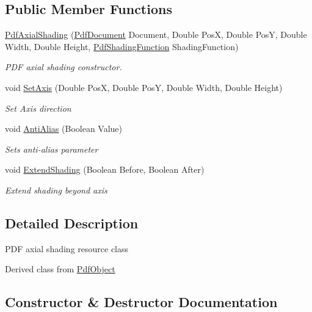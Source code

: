 \subsection*{Public Member Functions}
\begin{DoxyCompactItemize}
\item 
\hyperlink{class_pdf_file_writer_1_1_pdf_axial_shading_a60f6a28af411f699517753a51635497b}{Pdf\+Axial\+Shading} (\hyperlink{class_pdf_file_writer_1_1_pdf_document}{Pdf\+Document} Document, Double PosX, Double PosY, Double Width, Double Height, \hyperlink{class_pdf_file_writer_1_1_pdf_shading_function}{Pdf\+Shading\+Function} Shading\+Function)
\begin{DoxyCompactList}\small\item\em P\+DF axial shading constructor. \end{DoxyCompactList}\item 
void \hyperlink{class_pdf_file_writer_1_1_pdf_axial_shading_ab5c13f332bc79a16d22a405dc76cff51}{Set\+Axis} (Double PosX, Double PosY, Double Width, Double Height)
\begin{DoxyCompactList}\small\item\em Set Axis direction \end{DoxyCompactList}\item 
void \hyperlink{class_pdf_file_writer_1_1_pdf_axial_shading_ab09c04cd9336d9aa3c5f469525f1e1c5}{Anti\+Alias} (Boolean Value)
\begin{DoxyCompactList}\small\item\em Sets anti-\/alias parameter \end{DoxyCompactList}\item 
void \hyperlink{class_pdf_file_writer_1_1_pdf_axial_shading_af079414979386a5d1b6e74c09ba491c7}{Extend\+Shading} (Boolean Before, Boolean After)
\begin{DoxyCompactList}\small\item\em Extend shading beyond axis \end{DoxyCompactList}\end{DoxyCompactItemize}


\subsection{Detailed Description}
P\+DF axial shading resource class 

Derived class from \hyperlink{class_pdf_file_writer_1_1_pdf_object}{Pdf\+Object} 

\subsection{Constructor \& Destructor Documentation}
